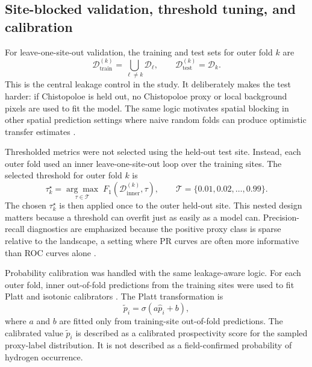 \documentclass[numrefs]{interact}
\let\cite\citep
\theoremstyle{plain}%
\theoremstyle{definition}
\theoremstyle{remark}
\begin{document}
\subsection{Site-blocked validation, threshold tuning, and calibration}
For leave-one-site-out validation, the training and test sets for outer fold \(k\) are
\begin{equation}
    \mathcal{D}^{(k)}_{\mathrm{train}}
    =
    \bigcup_{\ell\ne k}\mathcal{D}_{\ell},
    \qquad
    \mathcal{D}^{(k)}_{\mathrm{test}}
    =
    \mathcal{D}_{k}.
    \label{eq:loso}
\end{equation}
This is the central leakage control in the study. It deliberately makes the test harder: if Chistopoloe is held out, no Chistopoloe proxy or local background pixels are used to fit the model. The same logic motivates spatial blocking in other spatial prediction settings where naive random folds can produce optimistic transfer estimates \cite{roberts2017crossvalidation,valavi2019blockcv}.

Thresholded metrics were not selected using the held-out test site. Instead, each outer fold used an inner leave-one-site-out loop over the training sites. The selected threshold for outer fold \(k\) is
\begin{equation}
    \tau_k^\star =
    \underset{\tau\in\mathcal{T}}{\arg\max}
    \;
    F_1
    \left(
    \mathcal{D}^{(k)}_{\mathrm{inner}},
    \tau
    \right),
    \qquad
    \mathcal{T}=\{0.01,0.02,\ldots,0.99\}.
    \label{eq:threshold}
\end{equation}
The chosen \(\tau_k^\star\) is then applied once to the outer held-out site. This nested design matters because a threshold can overfit just as easily as a model can. Precision-recall diagnostics are emphasized because the positive proxy class is sparse relative to the landscape, a setting where PR curves are often more informative than ROC curves alone \cite{saito2015precision}.

Probability calibration was handled with the same leakage-aware logic. For each outer fold, inner out-of-fold predictions from the training sites were used to fit Platt and isotonic calibrators \cite{platt1999probabilistic}. The Platt transformation is
\begin{equation}
    \tilde{p}_i =
    \sigma
    \left(
    a\hat{p}_i + b
    \right),
    \label{eq:platt}
\end{equation}
where \(a\) and \(b\) are fitted only from training-site out-of-fold predictions. The calibrated value \(\tilde{p}_i\) is described as a calibrated prospectivity score for the sampled proxy-label distribution. It is not described as a field-confirmed probability of hydrogen occurrence.
\end{document}
